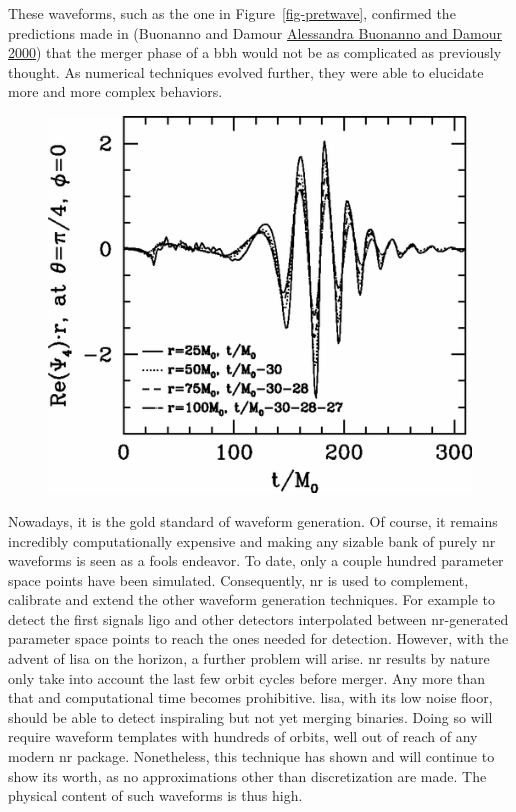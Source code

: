 \documentclass[
  11pt,
  a4paper,
  DIV=11,
  numbers=noendperiod,
  oneside]{scrreprt}
\DeclareRobustCommand{\[}{\begin{equation}}
\DeclareRobustCommand{\]}{\end{equation}}
\begin{document}
These waveforms, such as the one in Figure~\ref{fig-pretwave}, confirmed
the predictions made in (Buonanno and Damour
\protect\hyperlink{ref-Buonanno:2000ef}{Alessandra Buonanno and Damour
2000}) that the merger phase of a \gls{bbh} would not be as complicated
as previously thought. As numerical techniques evolved further, they
were able to elucidate more and more complex behaviors.

\begin{figure}


{\centering \includegraphics{./pretwave.png}

}

\end{figure}

Nowadays, it is the gold standard of waveform generation. Of course, it
remains incredibly computationally expensive  and
making any sizable bank of purely \gls{nr} waveforms is seen as a fools
endeavor. To date, only a couple hundred parameter space points have
been simulated. Consequently, \gls{nr} is used to complement, calibrate
and extend the other waveform generation techniques. For example to
detect the first signals \gls{ligo} and other detectors interpolated
between \gls{nr}-generated parameter space points to reach the ones
needed for detection. However, with the advent of \gls{lisa} on the
horizon, a further problem will arise. \gls{nr} results by nature only
take into account the last few orbit cycles before merger. Any more than
that and computational time becomes prohibitive. \gls{lisa}, with its
low noise floor, should be able to detect inspiraling but not yet
merging binaries. Doing so will require waveform templates with hundreds
of orbits, well out of reach of any modern \gls{nr} package.
Nonetheless, this technique has shown and will continue to show its
worth, as no approximations other than discretization are made. The
physical content of such waveforms is thus high.
\end{document}
